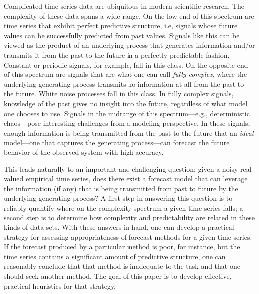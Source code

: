 %
Complicated time-series data are ubiquitous in modern scientific
research.  The complexity of these data spans a wide range.  On the
low end of this spectrum are time series that exhibit perfect
predictive structure, i.e, signals whose future values can be
successfully predicted from past values.  Signals like this can be
viewed as the product of an underlying process that generates
information and/or transmits it from the past to the future in a
perfectly predictable fashion.  Constant or periodic signals, for
example, fall in this class.  On the opposite end of this spectrum are
signals that are what one can call \emph{fully complex}, where the
underlying generating process transmits no information at all from the
past to the future.  White noise processes fall in this class.  In
fully complex signals, knowledge of the past gives no insight into the
future, regardless of what model one chooses to use. Signals in the
midrange of this spectrum---e.g., deterministic chaos---pose
interesting challenges from a modeling perspective.  In these signals,
enough information is being transmitted from the past to the future
that an \emph{ideal} model---one that captures the generating
process---can forecast the future behavior of the observed system with
high accuracy. 


This leads naturally to an important and challenging question: given a
noisy real-valued empirical time series, does there exist a forecast
model that can leverage the information (if any) that is being
transmitted from past to future by the underlying generating process?
A first step in answering this question is to reliably quantify where
on the complexity spectrum a given time series falls; a second step is
to determine how complexity and predictability are related in these
kinds of data sets.  With these answers in hand, one can develop a
practical strategy for assessing appropriateness of forecast methods
for a given time series.  If the forecast produced by a particular
method is poor, for instance, but the time series contains a
significant amount of predictive structure, one can reasonably
conclude that that method is inadequate to the task and that one
should seek another method.  The goal of this paper is to develop
effective, practical heuristics for that strategy.

